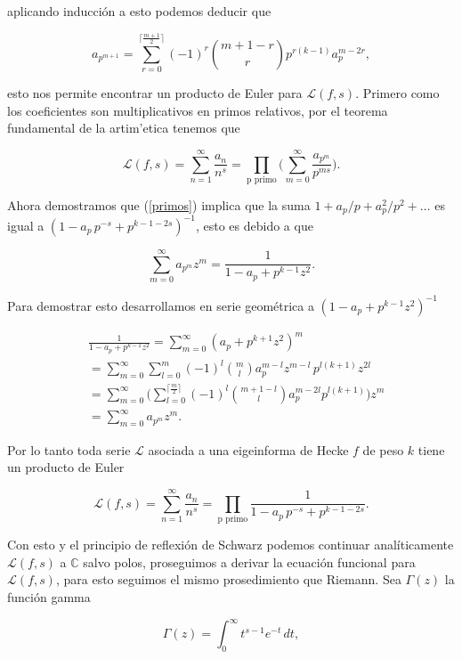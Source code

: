 \documentclass[letterpaper]{article}
\newcommand{\ga}{\ensuremath{\Gamma}}
\newcommand{\co}{\ensuremath{\mathbb C }}
\begin{document}
\noindent aplicando inducción a esto podemos deducir que

\begin{equation}\label{primos}
a_{p^{m+1}}=\sum_{r=0}^{\lceil\frac{m+1}{2}\rceil}(-1)^r \binom{m+1-r}{r} p^{r(k-1)}a_p^{m-2r},
\end{equation}

\noindent esto nos permite encontrar un producto de Euler para $\mathcal{L}(f,s)$. Primero como los coeficientes son multiplicativos en primos relativos, por el teorema fundamental de la artim'etica tenemos que

$$
\mathcal{L}(f,s)=\sum_{n=1}^{\infty}\frac{a_n}{n^s}=
\prod_{\textrm{p primo}}\Big(\sum_{m=0}^{\infty}\frac{a_{p^m}}{p^{ms}}\Big).
$$

Ahora demostramos que (\ref{primos}) implica que la suma $1+a_p/p+a_p^2/p^2+\ldots$ es igual a $(1-a_p\,p^{-s}+p^{k-1-2s})^{-1}$, esto es debido a que

$$
\sum_{m=0}^{\infty}a_{p^m}z^{m}=\frac{1}{1-a_p+p^{k-1}z^2}.
$$

\noindent Para demostrar esto desarrollamos en serie geométrica a $(1-a_p+p^{k-1}z^2)^{-1}$

\begin{align*}
&\frac{1}{1-a_p+p^{k-1}z^2}
= \sum_{m=0}^{\infty}(a_p+p^{k+1}z^2)^m \\
& = \sum_{m=0}^{\infty}\sum_{l=0}^m(-1)^l\binom{m}{l}a_p^{m-l}z^{m-l}\,p^{l(k+1)}z^{2l} \\
& = \sum_{m=0}^{\infty}\Big(\sum_{l=0}^{\lceil\frac{m}{2}\rceil}(-1)^l\binom{m+1-l}{l}a_p^{m-2l}p^{l(k+1)}\Big)z^{m}\\
& = \sum_{m=0}^{\infty}a_{p^m}z^{m}.
\end{align*}

Por lo tanto toda serie $\mathcal{L}$ asociada a una eigeinforma de Hecke $f$ de peso $k$ tiene un producto de Euler

\begin{equation}
\mathcal{L}(f,s)=\sum_{n=1}^{\infty}\frac{a_n}{n^s}=
\prod_{\textrm{p primo}}\frac{1}{1-a_p\,p^{-s}+p^{k-1-2s}}.
\end{equation}

Con esto y el principio de reflexión de Schwarz podemos continuar analíticamente $\mathcal{L}(f,s)$ a $\co$ salvo polos, proseguimos a derivar la ecuación funcional para $\mathcal{L}(f,s)$, para esto seguimos el mismo prosedimiento que Riemann. Sea $\ga(z)$ la función gamma

$$\ga(z)=\int_0^{\infty}t^{s-1}e^{-t}\,dt,$$
\end{document}
